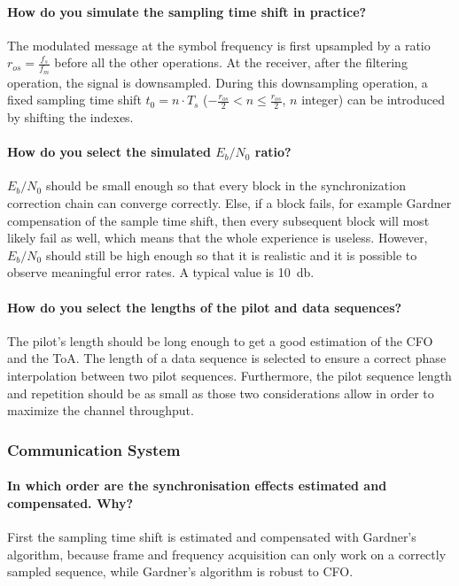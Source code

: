 \paragraph{How do you simulate the sampling time shift in practice?}The modulated message at the symbol frequency is first upsampled by a ratio $r_{os} = \frac{f_s}{f_m}$ before all the other operations.
At the receiver, after the filtering operation, the signal is downsampled.
During this downsampling operation, a fixed sampling time shift $t_0 = n \cdot T_s$ ($-\frac{r_{os}}{2} < n \leq \frac{r_{os}}{2}$, $n$ integer) can be introduced by shifting the indexes.

\paragraph{How do you select the simulated $E_{b}/N_{0}$ ratio?} $E_{b}/N_{0}$ should be small enough so that every block in the synchronization correction chain can converge correctly.
Else, if a block fails, for example Gardner compensation of the sample time shift, then every subsequent block will most likely fail as well, which means that the whole experience is useless.
However, $E_{b}/N_{0}$ should still be high enough so that it is realistic and it is possible to observe meaningful error rates.
A typical value is \SI{10}{\decibel}.

\paragraph{How do you select the lengths of the pilot and data sequences?} The pilot's length should be long enough to get a good estimation of the CFO and the ToA.
The length of a data sequence is selected to ensure a correct phase interpolation between two pilot sequences.
Furthermore, the pilot sequence length and repetition should be as small as those two considerations allow in order to maximize the channel throughput.

\subsubsection{Communication System}

\paragraph{In which order are the synchronisation effects estimated and compensated. Why?} First the sampling time shift is estimated and compensated with Gardner's algorithm, because frame and frequency acquisition can only work on a correctly sampled sequence, while Gardner's algorithm is robust to CFO.


